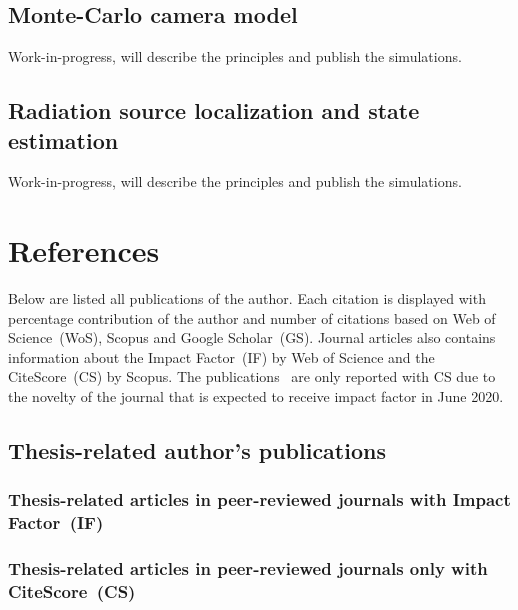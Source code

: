 \documentclass[a4paper,11pt,titlepage,twoside]{book}
\newcommand{\chapternoclear}[1]{
  \begingroup
  \let\cleardoublepage\clearpage
  \chapter{#1}
  \endgroup
}
\begin{document}
\section{Monte-Carlo camera model}

Work-in-progress, will describe the principles and publish the simulations.

\section{Radiation source localization and state estimation}

Work-in-progress, will describe the principles and publish the simulations.



\appendix
\renewcommand\chaptername{Appendix}

\chapternoclear{References}

Below are listed all publications of the author.
Each citation is displayed with percentage contribution of the author and number of citations based on Web of Science~(WoS), Scopus and Google Scholar~(GS).
Journal articles also contains information about the Impact Factor~(IF) by Web of Science and the CiteScore~(CS) by Scopus.
The publications~\cite{loianno2018localization, petrlik2020robust, stibinger2020localization, saikin2020wildfire} are only reported with CS due to the novelty of the journal that is expected to receive impact factor in June 2020.

\section{Thesis-related author's publications}

\subsection*{Thesis-related articles in peer-reviewed journals with Impact Factor~(IF)}
\printbibliography[keyword={mine},keyword={phd_related},keyword={journal},keyword={if},heading=none,title={}]

\subsection*{Thesis-related articles in peer-reviewed journals only with CiteScore~(CS)}
\printbibliography[keyword={mine},keyword={phd_related},keyword={journal},keyword={cs},heading=none,title={}]
\end{document}
